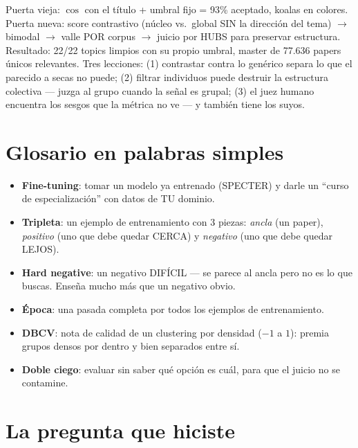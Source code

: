 \documentclass[11pt,a4paper]{article}
\begin{document}
\begin{resumen}
Puerta vieja: $\cos$ con el título + umbral fijo = 93\% aceptado, koalas en colores.
Puerta nueva: score contrastivo (núcleo vs.\ global SIN la dirección del tema) $\to$
bimodal $\to$ valle POR corpus $\to$ juicio por HUBS para preservar estructura.
Resultado: 22/22 topics limpios con su propio umbral, master de 77.636 papers únicos
relevantes. Tres lecciones: (1) contrastar contra lo genérico separa lo que el parecido
a secas no puede; (2) filtrar individuos puede destruir la estructura colectiva ---
juzga al grupo cuando la señal es grupal; (3) el juez humano encuentra los sesgos que
la métrica no ve --- y también tiene los suyos.
\end{resumen}
\clearpage
{}
{}

\section{Glosario en palabras simples}

\begin{itemize}
  \item \textbf{Fine-tuning}: tomar un modelo ya entrenado (SPECTER) y darle un
        ``curso de especialización'' con datos de TU dominio.
  \item \textbf{Tripleta}: un ejemplo de entrenamiento con 3 piezas: \emph{ancla} (un
        paper), \emph{positivo} (uno que debe quedar CERCA) y \emph{negativo} (uno que
        debe quedar LEJOS).
  \item \textbf{Hard negative}: un negativo DIFÍCIL --- se parece al ancla pero no es lo
        que buscas. Enseña mucho más que un negativo obvio.
  \item \textbf{Época}: una pasada completa por todos los ejemplos de entrenamiento.
  \item \textbf{DBCV}: nota de calidad de un clustering por densidad ($-1$ a $1$):
        premia grupos densos por dentro y bien separados entre sí.
  \item \textbf{Doble ciego}: evaluar sin saber qué opción es cuál, para que el juicio
        no se contamine.
\end{itemize}

\section{La pregunta que hiciste}
\end{document}
